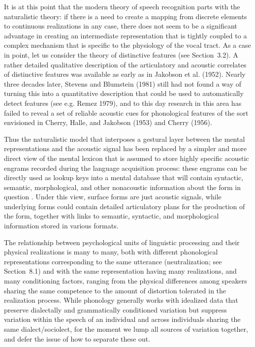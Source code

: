 It is at this point that the modern theory of speech recognition parts with
the naturalistic theory: if there is a need to create a mapping from discrete
elements to continuous realizations in any case, there does not seem to be a
significant advantage in creating an intermediate representation that is
tightly coupled to a complex mechanism that is specific to the physiology of
the vocal tract. As a case in point, let us consider the theory of distinctive
features (see Section~3.2). A rather detailed qualitative description of the
articulatory and acoustic correlates of distinctive features was available as
early as in Jakobson et al. (1952). Nearly three decades later, Stevens and
Blumstein (1981) still had not found a way of turning this into a quantitative
description that could be used to automatically detect features (see e.g.
Remez 1979),\nocite{Remez:1979} and to this day research in this area has
failed to reveal a set of reliable acoustic cues for phonological features of
the sort envisioned in Cherry, Halle, and Jakobson (1953)\nocite{Cherry:1953}
and Cherry (1956).

Thus the naturalistic model that interposes a gestural layer between the
mental representations and the acoustic signal has been replaced by a simpler
and more direct view of the mental lexicon that is assumed to store highly
specific acoustic engrams recorded during the language acquisition process:
these engrams can be directly used as lookup keys into a mental database that
will contain syntactic, semantic, morphological, and other nonacoustic
information about the form in question \cite{Klatt:1980}.  Under this view,
surface forms are just acoustic signals, while underlying forms could contain
detailed articulatory plans for the production of the form, together with
links to semantic, syntactic, and morphological information stored in various
formats. 

The relationship between psychological units of linguistic processing and
their physical realizations is many to many, both with different phonological
representations corresponding to the same utterance (neutralization; see
Section~8.1) and with the same representation having many realizations, and
many conditioning factors, ranging from the physical differences
among speakers sharing the same competence to the amount of distortion
tolerated in the realization process. While phonology generally works with
idealized data that preserve dialectally and grammatically conditioned
variation but suppress variation within the speech of an individual and
across individuals sharing the same dialect/sociolect, for the moment we lump
all sources of variation together, and defer the issue of how to separate
these out.

